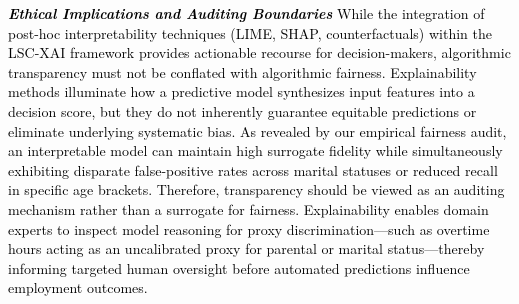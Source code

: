 \documentclass[a4paper,fleqn]{cas-sc}
\begin{document}
\textcolor{black}{\textit{\textbf{Ethical Implications and Auditing Boundaries}}
While the integration of post-hoc interpretability techniques (LIME, SHAP, counterfactuals) within the LSC-XAI framework provides actionable recourse for decision-makers, algorithmic transparency must not be conflated with algorithmic fairness. Explainability methods illuminate how a predictive model synthesizes input features into a decision score, but they do not inherently guarantee equitable predictions or eliminate underlying systematic bias.
As revealed by our empirical fairness audit, an interpretable model can maintain high surrogate fidelity while simultaneously exhibiting disparate false-positive rates across marital statuses or reduced recall in specific age brackets. Therefore, transparency should be viewed as an auditing mechanism rather than a surrogate for fairness. Explainability enables domain experts to inspect model reasoning for proxy discrimination—such as overtime hours acting as an uncalibrated proxy for parental or marital status—thereby informing targeted human oversight before automated predictions influence employment outcomes.}
\end{document}
